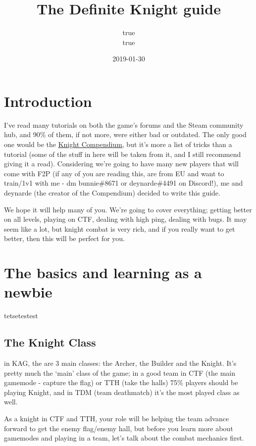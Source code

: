 \documentclass[]{book}
\title{The Definite Knight guide}
\author{true \\ true}
\date{2019-01-30}
\begin{document}
\maketitle

{
\setcounter{tocdepth}{1}
\tableofcontents
}
\chapter{Introduction}\label{introduction}

I've read many tutorials on both the game's forums and the Steam
community hub, and 90\% of them, if not more, were either bad or
outdated. The only good one would be the
\href{https://deynarde.github.io/kag-knight-compendium/}{Knight
Compendium}, but it's more a list of tricks than a tutorial (some of the
stuff in here will be taken from it, and I still recommend giving it a
read). Considering we're going to have many new players that will come
with F2P (if any of you are reading this, are from EU and want to
train/1v1 with me - dm bunnie\#8671 or deynarde\#4491 on Discord!), me
and deynarde (the creator of the Compendium) decided to write this
guide.

We hope it will help many of you. We're going to cover everything;
getting better on all levels, playing on CTF, dealing with high ping,
dealing with bugs. It may seem like a lot, but knight combat is very
rich, and if you really want to get better, then this will be perfect
for you.

\chapter{The basics and learning as a
newbie}\label{the-basics-and-learning-as-a-newbie}

tetsetestest

\section{The Knight Class}\label{the-knight-class}

in KAG, the are 3 main classes: the Archer, the Builder and the Knight.
It's pretty much the `main' class of the game; in a good team in CTF
(the main gamemode - capture the flag) or TTH (take the halls) 75\%
players should be playing Knight, and in TDM (team deathmatch) it's the
most played class as well.

As a knight in CTF and TTH, your role will be helping the team advance
forward to get the enemy flag/enemy hall, but before you learn more
about gamemodes and playing in a team, let's talk about the combat
mechanics first.
\end{document}
